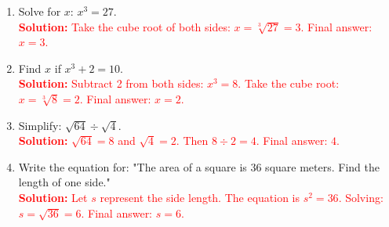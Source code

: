 \documentclass[10pt]{article}
\begin{document}
\begin{tcolorbox}[colframe=black!60, colback=white, 
coltitle=black, colbacktitle=black!15, fonttitle=\bfseries\Large, 
title=Exercises, halign title=center, left=10pt, right=10pt, top=10pt, bottom=60pt]
\begin{enumerate}[itemsep=3em]
    \item Solve for \(x\): \( x^3 = 27 \).\\
    \textcolor{red}{\textbf{Solution:} Take the cube root of both sides: \(x = \sqrt[3]{27} = 3\). Final answer: \(x = 3\).}

    \item Find \(x\) if \(x^3 + 2 = 10\).\\
    \textcolor{red}{\textbf{Solution:} Subtract 2 from both sides: \(x^3 = 8\). Take the cube root: \(x = \sqrt[3]{8} = 2\). Final answer: \(x = 2\).}

    \item Simplify: \( \sqrt{64} \div \sqrt{4} \).\\
    \textcolor{red}{\textbf{Solution:} \( \sqrt{64} = 8\) and \( \sqrt{4} = 2\). Then \(8 \div 2 = 4\). Final answer: \(4\).}

    \item Write the equation for: "The area of a square is 36 square meters. Find the length of one side."\\
    \textcolor{red}{\textbf{Solution:} Let \(s\) represent the side length. The equation is \(s^2 = 36\). Solving: \(s = \sqrt{36} = 6\). Final answer: \(s = 6\).}
\end{enumerate}
\end{tcolorbox}

\vspace{1em}
\end{document}
